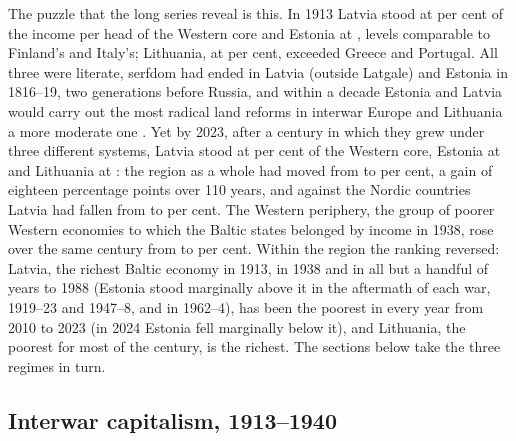 







The puzzle that the long series reveal is this. In 1913 Latvia stood at  per cent of the income per head of the Western core and Estonia at , levels comparable to Finland's and Italy's; Lithuania, at  per cent, exceeded Greece and Portugal. All three were literate, serfdom had ended in Latvia (outside Latgale) and Estonia in 1816--19, two generations before Russia, and within a decade Estonia and Latvia would carry out the most radical land reforms in interwar Europe and Lithuania a more moderate one \parencites[30]{clemens_2003_comparative}[358--9]{norkusdvides}. Yet by 2023, after a century in which they grew under three different systems, Latvia stood at  per cent of the Western core, Estonia at  and Lithuania at : the region as a whole had moved from  to  per cent, a gain of eighteen percentage points over 110 years, and against the Nordic countries Latvia had fallen from  to  per cent. The Western periphery, the group of poorer Western economies to which the Baltic states belonged by income in 1938, rose over the same century from  to  per cent. Within the region the ranking reversed: Latvia, the richest Baltic economy in 1913, in 1938 and in all but a handful of years to 1988 (Estonia stood marginally above it in the aftermath of each war, 1919--23 and 1947--8, and in 1962--4), has been the poorest in every year from 2010 to 2023 (in 2024 Estonia fell marginally below it), and Lithuania, the poorest for most of the century, is the richest. The sections below take the three regimes in turn.

\subsection{Interwar capitalism, 1913--1940}

